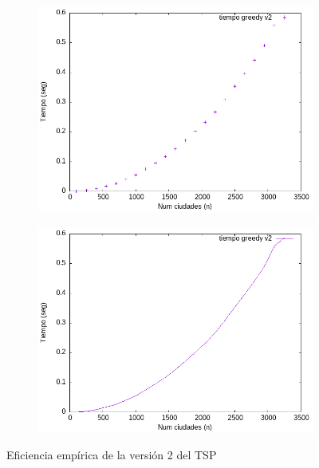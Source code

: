 \documentclass{article}
\begin{document}
\begin{figure}[H]
    \centering
    \begin{subfigure}[b]{0.45\textwidth}
        \centering
        \includegraphics[width=\textwidth]{Problema4/imagenes/TSP_V2_empirica_points.png}
    \end{subfigure}
    \begin{subfigure}[b]{0.45\textwidth}
        \centering
        \includegraphics[width=\textwidth]{Problema4/imagenes/TSP_V2_empirica_lines.png}
    \end{subfigure}
    \caption{Eficiencia empírica de la versión 2 del TSP}
    \label{fig:p4_v2_emp}
\end{figure}
\end{document}
